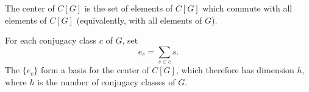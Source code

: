 The center of $C[G]$ is the set of elements of $C[G]$ which commute with all elements of $C[G]$ (equivalently, with all elements of $G$).

For each conjugacy class $c$ of $G$, set
$$e_c = \sum_{s \in c} s.$$
The $\{e_c\}$ form a basis for the center of $C[G]$, which therefore has dimension $h$, where $h$ is the number of conjugacy classes of $G$.

